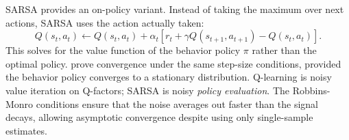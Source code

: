 SARSA provides an on-policy variant. Instead of taking the maximum over next actions, SARSA uses the action actually taken:
\begin{equation}
Q(s_t, a_t) \leftarrow Q(s_t, a_t) + \alpha_t \left[ r_t + \gamma Q(s_{t+1}, a_{t+1}) - Q(s_t, a_t) \right].
\end{equation}
This solves for the value function of the behavior policy $\pi$ rather than the optimal policy. \citet{singh2000} prove convergence under the same step-size conditions, provided the behavior policy converges to a stationary distribution. Q-learning is noisy value iteration on Q-factors; SARSA is noisy \emph{policy evaluation}. The Robbins-Monro conditions ensure that the noise averages out faster than the signal decays, allowing asymptotic convergence despite using only single-sample estimates.

